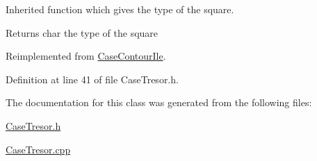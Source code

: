 Inherited function which gives the type of the square. 

\begin{DoxyReturn}{Returns}
char the type of the square 
\end{DoxyReturn}


Reimplemented from \hyperlink{class_case_contour_ile_abf6a6d756b756611d0cc1f94260a6640}{CaseContourIle}.



Definition at line 41 of file CaseTresor.h.



The documentation for this class was generated from the following files:\begin{DoxyCompactItemize}
\item 
\hyperlink{_case_tresor_8h}{CaseTresor.h}\item 
\hyperlink{_case_tresor_8cpp}{CaseTresor.cpp}\end{DoxyCompactItemize}
